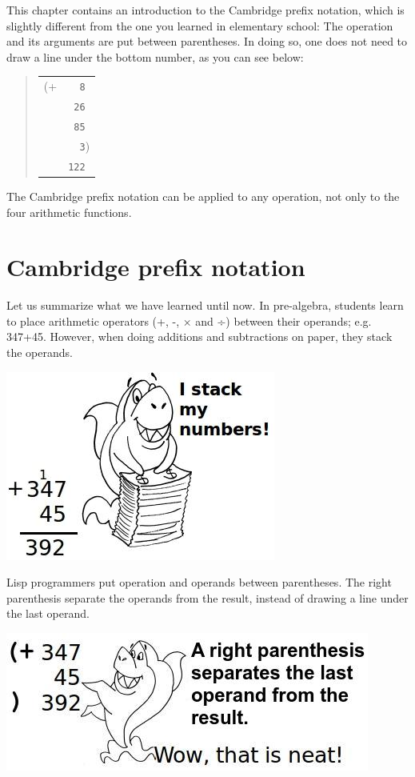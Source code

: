 \documentclass[a4paper,12pt]{book}
\begin{document}
This chapter contains an introduction to
the Cambridge prefix notation, 
which is slightly different from the one you
learned in elementary school: The operation
and its arguments are put between parentheses.
In doing so, one does not need to draw a line
under the bottom number, as you can see below:
\begin{quote}
\begin{tabular}{p{0.5cm}p{1cm}}
(+ &\verb|  8|\\
&\verb| 26|\\
&\verb| 85|\\
&\verb|  3|)\\
&\verb|122|
\end{tabular}
\end{quote}
The Cambridge prefix notation can be applied
to any operation, not only to the four arithmetic
functions. 

\section{Cambridge prefix notation}
Let us summarize what we have learned
until now. In pre-algebra, students
learn to place arithmetic operators (+, -, × and ÷)
between their operands; e.g. 347+45.
However, when doing additions and subtractions
on paper, they stack the operands.

\includegraphics{figs-prefix/stackshark.jpg}


Lisp programmers put operation and operands
between parentheses. The right parenthesis
separate the operands from the result,
instead of drawing a line under the last operand.

\includegraphics{figs-prefix/neatsum.jpg}
\end{document}
